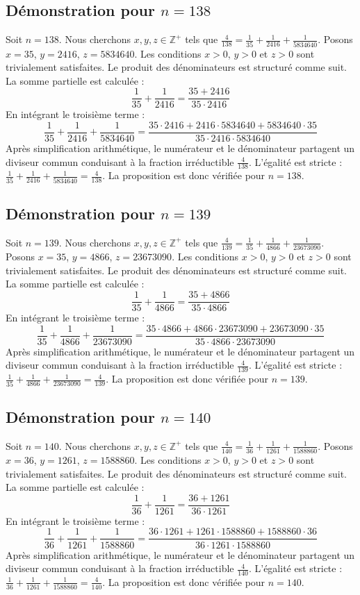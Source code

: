 \documentclass[11pt,a4paper]{article}
\begin{document}
\subsection{Démonstration pour $n = 138$}
Soit $n = 138$. Nous cherchons $x, y, z \in \mathbb{Z}^{+}$ tels que $\frac{4}{138} = \frac{1}{35} + \frac{1}{2416} + \frac{1}{5834640}$.
Posons $x = 35$, $y = 2416$, $z = 5834640$.
Les conditions $x > 0$, $y > 0$ et $z > 0$ sont trivialement satisfaites.
Le produit des dénominateurs est structuré comme suit. La somme partielle est calculée :
$$ \frac{1}{35} + \frac{1}{2416} = \frac{35+2416}{35 \cdot 2416} $$
En intégrant le troisième terme :
$$ \frac{1}{35} + \frac{1}{2416} + \frac{1}{5834640} = \frac{35 \cdot 2416 + 2416 \cdot 5834640 + 5834640 \cdot 35}{35 \cdot 2416 \cdot 5834640} $$
Après simplification arithmétique, le numérateur et le dénominateur partagent un diviseur commun conduisant à la fraction irréductible $\frac{4}{138}$.
L'égalité est stricte : $\frac{1}{35} + \frac{1}{2416} + \frac{1}{5834640} = \frac{4}{138}$.
La proposition est donc vérifiée pour $n = 138$.
\subsection{Démonstration pour $n = 139$}
Soit $n = 139$. Nous cherchons $x, y, z \in \mathbb{Z}^{+}$ tels que $\frac{4}{139} = \frac{1}{35} + \frac{1}{4866} + \frac{1}{23673090}$.
Posons $x = 35$, $y = 4866$, $z = 23673090$.
Les conditions $x > 0$, $y > 0$ et $z > 0$ sont trivialement satisfaites.
Le produit des dénominateurs est structuré comme suit. La somme partielle est calculée :
$$ \frac{1}{35} + \frac{1}{4866} = \frac{35+4866}{35 \cdot 4866} $$
En intégrant le troisième terme :
$$ \frac{1}{35} + \frac{1}{4866} + \frac{1}{23673090} = \frac{35 \cdot 4866 + 4866 \cdot 23673090 + 23673090 \cdot 35}{35 \cdot 4866 \cdot 23673090} $$
Après simplification arithmétique, le numérateur et le dénominateur partagent un diviseur commun conduisant à la fraction irréductible $\frac{4}{139}$.
L'égalité est stricte : $\frac{1}{35} + \frac{1}{4866} + \frac{1}{23673090} = \frac{4}{139}$.
La proposition est donc vérifiée pour $n = 139$.
\subsection{Démonstration pour $n = 140$}
Soit $n = 140$. Nous cherchons $x, y, z \in \mathbb{Z}^{+}$ tels que $\frac{4}{140} = \frac{1}{36} + \frac{1}{1261} + \frac{1}{1588860}$.
Posons $x = 36$, $y = 1261$, $z = 1588860$.
Les conditions $x > 0$, $y > 0$ et $z > 0$ sont trivialement satisfaites.
Le produit des dénominateurs est structuré comme suit. La somme partielle est calculée :
$$ \frac{1}{36} + \frac{1}{1261} = \frac{36+1261}{36 \cdot 1261} $$
En intégrant le troisième terme :
$$ \frac{1}{36} + \frac{1}{1261} + \frac{1}{1588860} = \frac{36 \cdot 1261 + 1261 \cdot 1588860 + 1588860 \cdot 36}{36 \cdot 1261 \cdot 1588860} $$
Après simplification arithmétique, le numérateur et le dénominateur partagent un diviseur commun conduisant à la fraction irréductible $\frac{4}{140}$.
L'égalité est stricte : $\frac{1}{36} + \frac{1}{1261} + \frac{1}{1588860} = \frac{4}{140}$.
La proposition est donc vérifiée pour $n = 140$.
\end{document}
